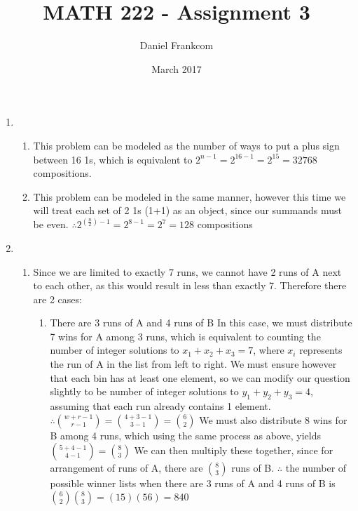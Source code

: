 \documentclass{article}
\title{MATH 222 - Assignment 3}
\date{March 2017}
\author{Daniel Frankcom}
\begin{document}
	\maketitle
	\setlength{\parindent}{0pt}
	\newcommand{\forceindent}{\leavevmode{\parindent=72pt\indent}}
	\newpage
	
	\begin{enumerate}
		\item 
		\begin{enumerate}
			\item This problem can be modeled as the number of ways to put a plus sign between 16 1s, which is equivalent to $2^{n-1}=2^{16-1}=2^{15}=32768$ compositions.
			
			\item This problem can be modeled in the same manner, however this time we will treat each set of 2 1s (1+1) as an object, since our summands must be even.
			\newline $\therefore 2^{(\frac{n}{2})-1}=2^{8-1}=2^7=128$ compositions 
		\end{enumerate}
		
		\item
		\begin{enumerate}
			\item Since we are limited to exactly 7 runs, we cannot have 2 runs of A next to each other, as this would result in less than exactly 7. Therefore there are 2 cases:
			\begin{enumerate}
				\item There are 3 runs of A and 4 runs of B
				\newline In this case, we must distribute 7 wins for A among 3 runs, which is equivalent to counting the number of integer solutions to $x_1+x_2+x_3=7$, where $x_i$ represents the run of A in the list from left to right.
				\newline We must ensure however that each bin has at least one element, so we can modify our question slightly to be number of integer solutions to $y_1+y_2+y_3=4$, assuming that each run already contains 1 element.
				\newline $\therefore {{w+r-1}\choose{r-1}}={{4+3-1}\choose{3-1}}={6\choose2}$
				\newline We must also distribute 8 wins for B among 4 runs, which using the same process as above, yields ${{5+4-1}\choose{4-1}}={8\choose3}$
				\newline We can then multiply these together, since for arrangement of runs of A, there are ${8\choose3}$ runs of B.
				\newline $\therefore$ the number of possible winner lists when there are 3 runs of A and 4 runs of B is ${6\choose2}{8\choose3}=(15)(56)=840$
				

\end{enumerate}
\end{enumerate}
\end{enumerate}
\end{document}
